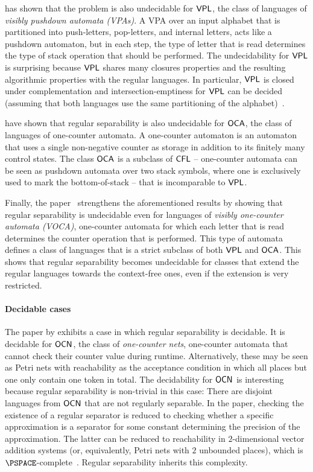 \documentclass[../../diss.tex]{subfiles}
\begin{document}
 has shown that the problem is also undecidable for ${\mathsf{VPL}}$, the class of languages of \emph{visibly pushdown automata (VPAs)}.
A VPA over an input alphabet that is partitioned into push-letters, pop-letters, and internal letters, acts like a pushdown automaton, but in each step, the type of letter that is read determines the type of stack operation that should be performed.
The undecidability for ${\mathsf{VPL}}$ is surprising because ${\mathsf{VPL}}$ shares many closures properties and the resulting algorithmic properties with the regular languages.
In particular, ${\mathsf{VPL}}$ is closed under complementation and intersection-emptiness for ${\mathsf{VPL}}$ can be decided (assuming that both languages use the same partitioning of the alphabet)~\cite{AlurM04}.

 have shown that regular separability is also undecidable for ${\mathsf{OCA}}$, the class of languages of one-counter automata.
A one-counter automaton is an automaton that uses a single non-negative counter as storage in addition to its finitely many control states.
The class ${\mathsf{OCA}}$ is a subclass of ${\mathsf{CFL}}$ -- one-counter automata can be seen as pushdown automata over two stack symbols, where one is exclusively used to mark the bottom-of-stack -- that is incomparable to ${\mathsf{VPL}}$.

Finally, the paper~\cite{ClementeCLP17} strengthens the aforementioned results by showing that regular separability is undecidable even for languages of \emph{visibly one-counter automata (VOCA)}, one-counter automata for which each letter that is read determines the counter operation that is performed.
This type of automata defines a class of languages that is a strict subclass of both ${\mathsf{VPL}}$ and ${\mathsf{OCA}}$.
This shows that regular separability becomes undecidable for classes that extend the regular languages towards the context-free ones, even if the extension is very restricted.

\paragraph{Decidable cases}

The paper by  exhibits a case in which regular separability is decidable.
It is decidable for ${\mathsf{OCN}}$, the class of \emph{one-counter nets}, one-counter automata that cannot check their counter value during runtime.
Alternatively, these may be seen as Petri nets with reachability as the acceptance condition in which all places but one only contain one token in total.
The decidability for ${\mathsf{OCN}}$ is interesting because regular separability is non-trivial in this case: There are disjoint languages from ${\mathsf{OCN}}$ that are not regularly separable.
In the paper, checking the existence of a regular separator is reduced to checking whether a specific approximation is a separator for some constant determining the precision of the approximation.
The latter can be reduced to reachability in $2$-dimensional vector addition systems (or, equivalently, Petri nets with $2$ unbounded places), which is $\PSPACE$-complete~\cite{BlondinFGHM15}.
Regular separability inherits this complexity.
\end{document}
